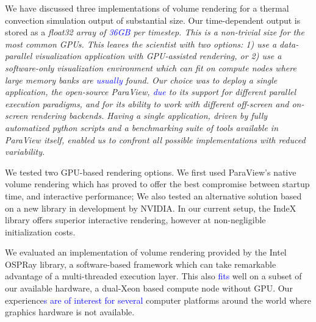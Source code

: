 \documentclass[5p,times]{elsarticle}
\begin{document}
We have discussed three implementations of volume rendering for a thermal convection
simulation output of substantial size. Our time-dependent output is stored as a
\it{float32} \rm array of \textcolor{blue}{36GB} per timestep. This is a non-trivial size for the most common
GPUs. This leaves the scientist with two options: 1) use a data-parallel visualization
application with GPU-assisted rendering, or 2) use a \it{software-only} \rm
visualization environment which can fit on compute nodes where large memory
banks are \textcolor{blue}{usually} found. Our choice was to deploy a single application, the open-source
ParaView, \textcolor{blue}{due} to its support for different parallel execution paradigms, and for its ability to work with different off-screen and on-screen rendering backends. Having a single application,
driven by fully automatized python scripts and a benchmarking suite of tools
available in ParaView itself, enabled us to confront all possible implementations with reduced variability.

We tested two GPU-based rendering options. We first used ParaView's native volume rendering which has proved to offer the best compromise between startup time, and interactive performance; We also tested an alternative solution based on a new library in development by NVIDIA. In our current setup, the IndeX library offers superior interactive rendering, however at non-negligible initialization costs.

We evaluated an implementation of volume rendering provided by the Intel OSPRay library,
a software-based framework which can take remarkable advantage of a multi-threaded
execution layer. This also \textcolor{blue}{fits} well on a subset of our available hardware, a dual-Xeon based compute node without GPU. Our experience\textcolor{blue}{s are of interest for several} computer platforms around the world where graphics hardware is not available. 
\end{document}
